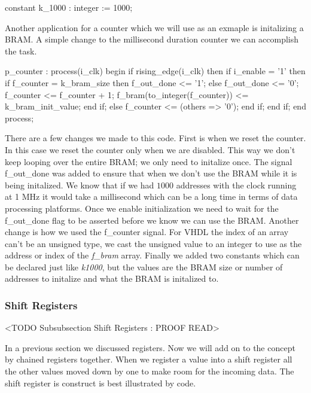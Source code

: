 \begin{VHDLlisting}[tabsize=8]
constant k\_1000 : integer := 1000;
\end{VHDLlisting}

Another application for a counter which we will use as an exmaple is initalizing a \ac{BRAM}. A simple change to the millisecond duration counter we can accomplish the task.

\begin{VHDLlisting}[tabsize=8]
p\_counter : process(i\_clk) 
begin
	if rising\_edge(i\_clk) then
		if i\_enable = '1' then
			if f\_counter = k\_bram\_size then
				f\_out\_done <= '1';
			else
				f\_out\_done <= '0';
				f\_counter <= f\_counter + 1;
				f\_bram(to\_integer(f\_counter)) <= k\_bram\_init\_value;
			end if;
		else	
			f\_counter <= (others => '0');
		end if;
	end if;
end process;
\end{VHDLlisting}

There are a few changes we made to this code. First is when we reset the counter. In this case we reset the counter only when we are disabled. This way we don't keep looping over the entire \ac{BRAM}; we only need to initalize once. The signal f\_out\_done was added to ensure that when we don't use the \ac{BRAM} while it is being initalized. We know that if we had $1000$ addresses with the clock running at 1 \ac{MHz} it would take a millisecond which can be a long time in terms of data processing platforms. Once we enable initialization we need to wait for the f\_out\_done flag to be asserted before we know we can use the \ac{BRAM}. Another change is how we used the f\_counter signal. For \ac{VHDL} the index of an array can't be an unsigned type, we cast the unsigned value to an integer to use as the address or index of the \emph{f\_bram} array. Finally we added two constants which can be declared just like \emph{k1000}, but the values are the \ac{BRAM} size or number of addresses to initalize and what the \ac{BRAM} is initalized to. 


\subsubsection{Shift Registers}
	<TODO Subsubsection  Shift Registers : PROOF READ>

In a previous section we discussed registers. Now we will add on to the concept by chained registers together. When we register a value into a shift register all the other values moved down by one to make room for the incoming data. The shift register is construct is best illustrated by code. 

